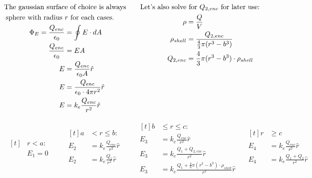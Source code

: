 \documentclass[11pt]{article}
\begin{document}
\begin{align*}
\begin{aligned}[t]
\text{The gaussian surfac}&\text{e of choice is always} \\
\text{sphere with radius }&\text{\( r \) for each cases.} \\
\Phi_{E} = \frac{Q_{enc}}{\epsilon_{0}} &= \oint E \cdot dA \\
\frac{Q_{enc}}{\epsilon_{0}} &= EA \\
E &= \frac{Q_{enc}}{\epsilon_{0} A} \hat{r} \\
E &= \frac{Q_{enc}}{\epsilon_{0} \cdot 4 \pi r^2} \hat{r} \\
E &= k_e \frac{Q_{enc}}{r^2} \hat{r}
\end{aligned}
\qquad
\begin{aligned}[t]
\text{Let's also solve}&\text{ for \( Q_{2, enc} \) for later use:} \\
\rho &= \frac{Q}{V} \\
\rho_{shell} &= \frac{Q_{2, enc}}{\frac{4}{3} \pi (r^3 - b^3)} \\
Q_{2, enc} &= \frac{4}{3} \pi (r^3 - b^3) \cdot \rho_{shell}
\end{aligned}
\end{align*}

\begin{align*}
\begin{aligned}[t]
&r < a: \\
&E_1 = 0
\end{aligned}
\qquad
\begin{aligned}[t]
a &< r \leq b: \\
E_2 &= k_e \frac{Q_{enc}}{r^2} \hat{r} \\
E_2 &= k_e \frac{Q_1}{r^2} \hat{r} \\
\end{aligned}
\qquad
\begin{aligned}[t]
b &\leq r \leq c: \\
E_3 &= k_e \frac{Q_{enc}}{r^2} \hat{r} \\
E_3 &= k_e \frac{Q_1 + Q_{2,enc}}{r^2} \hat{r} \\
E_3 &= k_e \frac{Q_1 + \frac{4}{3} \pi (r^3 - b^3) \cdot \rho_{shell}}{r^2} \hat{r}
\end{aligned}
\quad
\begin{aligned}[t]
r &\geq c \\
E_4 &= k_e \frac{Q_{enc}}{r^2}\hat{r} \\
E_4 &= k_e \frac{Q_1 + Q_{2}}{r^2}\hat{r} \\
\end{aligned}
\end{align*}
\end{document}
